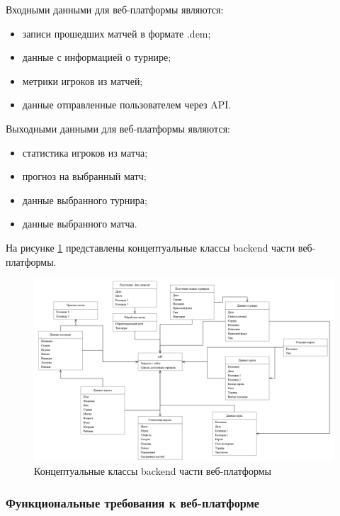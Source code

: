 Входными данными для веб-платформы являются:
\begin{itemize}
	\item записи прошедших матчей в формате .dem;
	\item данные с информацией о турнире;
	\item метрики игроков из матчей;
	\item данные отправленные пользователем через API.
\end{itemize}

Выходными данными для веб-платформы являются:
\begin{itemize}
	\item статистика игроков из матча;
	\item прогноз на выбранный матч;
	\item данные выбранного турнира;
	\item данные выбранного матча.
\end{itemize}

На рисунке \ref{fig:-conceptual_classes} представлены концептуальные классы backend части веб-платформы.
\begin{figure}
	\centering
	\includegraphics[width=0.9\linewidth]{"images/Концептуальные классы"}
	\caption[Концептуальные классы backend части веб-платформы]{Концептуальные классы backend части веб-платформы}
	\label{fig:-conceptual_classes}
\end{figure}

\subsubsection{Функциональные требования к веб-платформе}

